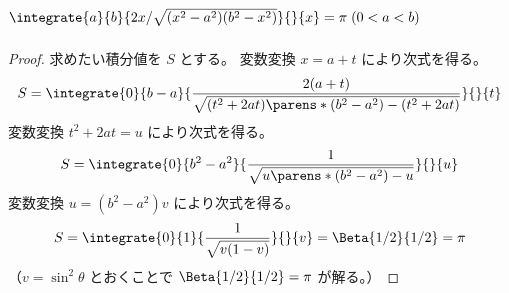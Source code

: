 		\section{\texorpdfstring{$\integrate{a}{b}{2x/\sqrt{(x^2-a^2)(b^2-x^2)}}{}{x}=\pi\;(0<a<b)$}{∫\_a\string^b 2x/sqrt((x\string^2-a\string^2)(b\string^2-x\string^2)) = π (0<a<b)}}
			\begin{proof}
				\quad\par
				求めたい積分値を $S$ とする。
				変数変換 $x=a+t$ により次式を得る。
				\[ S = \integrate{0}{b-a}{\frac{2(a+t)}{\sqrt{(t^2+2at)\parens*{(b^2-a^2)-(t^2+2at)}}}}{}{t} \]
				変数変換 $t^2+2at=u$ により次式を得る。
				\[ S = \integrate{0}{b^2-a^2}{\frac{1}{\sqrt{u\parens*{(b^2-a^2)-u}}}}{}{u} \]
				変数変換 $u=(b^2-a^2)v$ により次式を得る。
				\[ S = \integrate{0}{1}{\frac{1}{\sqrt{v(1-v)}}}{}{v} = \Beta{1/2}{1/2} = \pi \]
				（$v=\sin^2\theta$ とおくことで $\Beta{1/2}{1/2} = \pi$ が解る。）
			\end{proof}